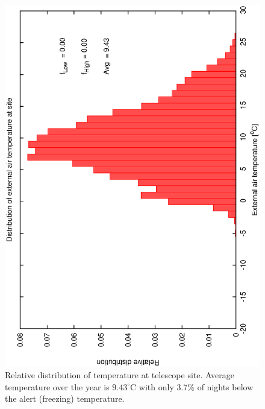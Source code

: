 \begin{figure}[htbp]
\begin{center}
    \includegraphics[scale=0.4, angle=-90]{figures/ecs/temp_1525.dat.eps}
\caption[Relative distribution of temperature at telescope site.]
{Relative distribution of temperature at telescope site. Average temperature over the year is $9.43^{\circ}$C with only 3.7\% of nights below the alert (freezing) temperature.}
\end{center}   
 \label{fig:met_temp_dist}
\end{figure}

